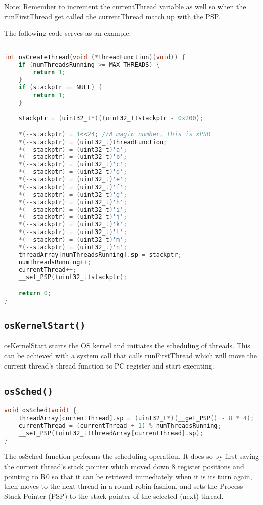 \documentclass{article}
\begin{document}
Note: Remember to increment the currentThread variable as well so when the runFirstThread get called the currentThread match up with the PSP.

The following code serves as an example:

\begin{lstlisting}[language=C]

int osCreateThread(void (*threadFunction)(void)) {
    if (numThreadsRunning >= MAX_THREADS) {
        return 1;
    }
    if (stackptr == NULL) {
        return 1;
    }

    stackptr = (uint32_t*)((uint32_t)stackptr - 0x200);

    *(--stackptr) = 1<<24; //A magic number, this is xPSR
    *(--stackptr) = (uint32_t)threadFunction; 
    *(--stackptr) = (uint32_t)'a'; 
    *(--stackptr) = (uint32_t)'b'; 
    *(--stackptr) = (uint32_t)'c'; 
    *(--stackptr) = (uint32_t)'d'; 
    *(--stackptr) = (uint32_t)'e'; 
    *(--stackptr) = (uint32_t)'f'; 
    *(--stackptr) = (uint32_t)'g'; 
    *(--stackptr) = (uint32_t)'h'; 
    *(--stackptr) = (uint32_t)'i'; 
    *(--stackptr) = (uint32_t)'j'; 
    *(--stackptr) = (uint32_t)'k'; 
    *(--stackptr) = (uint32_t)'l'; 
    *(--stackptr) = (uint32_t)'m'; 
    *(--stackptr) = (uint32_t)'n'; 
    threadArray[numThreadsRunning].sp = stackptr;
    numThreadsRunning++;
    currentThread++;
	__set_PSP((uint32_t)stackptr);

    return 0;
}\end{lstlisting}

\subsection{\texttt{osKernelStart()}}
osKernelStart starts the OS kernel and initiates the scheduling of threads. This can be achieved with a system call that calls runFirstThread which will move the current thread's thread function to PC register and start executing. 

\subsection{\texttt{osSched()}}
\begin{lstlisting}[language=C]
void osSched(void) {
    threadArray[currentThread].sp = (uint32_t*)(__get_PSP() - 8 * 4);
    currentThread = (currentThread + 1) % numThreadsRunning;
    __set_PSP((uint32_t)threadArray[currentThread].sp);
}
\end{lstlisting}
The osSched function performs the scheduling operation. It does so by first saving the current thread's stack pointer which moved down 8 register positions and pointing to R0 so that it can be retrieved immediately when it is its turn again, then moves to the next thread in a round-robin fashion, and sets the Process Stack Pointer (PSP) to the stack pointer of the selected (next) thread. 
\end{document}
